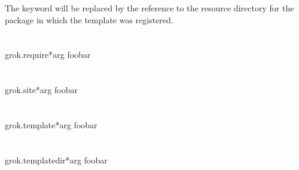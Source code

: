             The keyword  will be replaced by the reference to
            the resource directory for the package in which the template was
            registered.

    \section{}

        \begin{funcdesc}{grok.require}{*arg}
        foobar
        \end{funcdesc}

    \section{}

        \begin{funcdesc}{grok.site}{*arg}
        foobar
        \end{funcdesc}

    \section{}

        \begin{funcdesc}{grok.template}{*arg}
        foobar
        \end{funcdesc}

    \section{}

        \begin{funcdesc}{grok.templatedir}{*arg}
        foobar
        \end{funcdesc}
